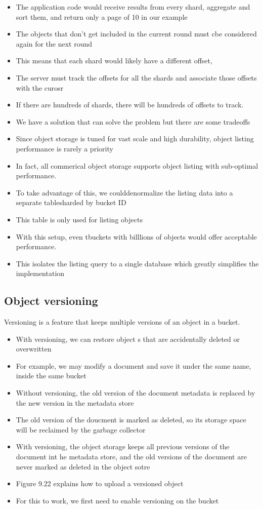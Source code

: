\documentclass{report}
\theoremstyle{definition}
\let\oldsubsection\subsection
\renewcommand{\subsection}{\oldsubsection*}
\begin{document}
\begin{itemize}
\item
The application code would receive results from every shard, aggregate and sort them, and return only a page of 10 in our example
\item
The objects that don't get included in the current round must cbe considered again for the next round
\item
This means that each shard would likely have a different offset,
\item
The server must track the offsets for all the shards and associate those offsets with the curosr
\item
If there are hundreds of shards, there will be hundreds of offsets to track.
\item
We have a solution that can solve the problem but there are some tradeoffs
\item
Since object storage is tuned for vast scale and high durability, object listing performance is rarely a priority
\item
In fact, all commerical object storage supports object listing with sub-optimal performance.
\item
To take advantage of this, we coulddenormalize the listing data into a separate tablesharded by bucket ID
\item
This table is only used for listing objects
\item
With this setup, even tbuckets with billlions of objects would offer acceptable performance.
\item
This isolates the listing query to a single database which greatly simplifies the implementation
\end{itemize}

\subsection{Object versioning}

Versioning is a feature that keeps multiple versions of an object in a bucket.

\begin{itemize}
\item
With versioning, we can restore object s that are accidentally deleted or overwritten
\item
For example, we may modify a document and save it under the same name, inside the same bucket
\item
Without versioning, the old version of the document metadata is replaced by the new version in the metadata store
\item
The old version of the doucment is marked as deleted, so its storage space will be reclaimed by the garbage collector
\item
With versioning, the object storage keeps all previous versions of the document int he metadata store, and the old versions of the document are never marked as deleted in the object sotre
\item
Figure 9.22 explains how to upload a versioned object
\item
For this to work, we first need to enable versioning on the bucket
\end{itemize}
\end{document}
